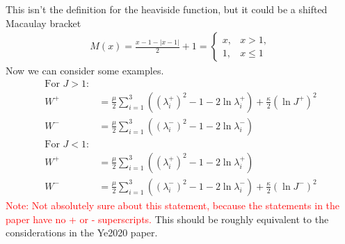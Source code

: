 \documentclass[12pt,3p]{article}
\numberwithin{equation}{section}
\begin{document}
This isn't the definition for the heaviside function, but it could be a shifted Macaulay bracket
\begin{align*}
M(x) = \frac{x-1 - |x-1|}{2} + 1 = 
\begin{cases}
	x, & x > 1, \\
	1, & x \leq 1	
\end{cases} 
\end{align*}
Now we can consider some examples. 
\begin{align*}
\text{For } J > 1: &\\
W^+ &= \frac{\mu}{2} \sum_{i = 1}^3 ( (\lambda_i^+)^2 - 1 - 2 \ln \lambda_i^+) + \frac{\kappa}{2} (\ln J^+)^2 \\
W^- &= \frac{\mu}{2} \sum_{i = 1}^3 ( (\lambda_i^-)^2 - 1 - 2 \ln \lambda_i^-)\\
\text{For } J < 1: &\\
W^+ &= \frac{\mu}{2} \sum_{i = 1}^3 ( (\lambda_i^+)^2 - 1 - 2 \ln \lambda_i^+) \\
W^- &= \frac{\mu}{2} \sum_{i = 1}^3 ( (\lambda_i^-)^2 - 1 - 2 \ln \lambda_i^-) + \frac{\kappa}{2} (\ln J^-)^2 
\end{align*} 
\textcolor{red}{Note: Not absolutely sure about this statement, because the statements in the paper have no + or - superscripts.} This should be roughly equivalent to the considerations in the Ye2020 paper. 
\end{document}
